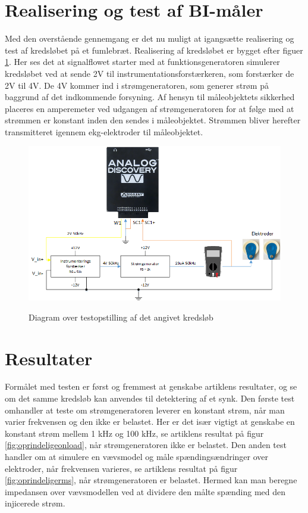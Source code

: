 \section{Realisering og test af BI-måler}

Med den overstående gennemgang er det nu muligt at igangsætte  realisering og test af kredsløbet på et fumlebræt. Realisering af kredsløbet er bygget efter figuer \ref{fig:testopstilling1}. Her ses det at signalflowet starter med at funktionsgeneratoren simulerer kredsløbet ved at sende 2V til instrumentationsforstærkeren, som forstærker de 2V til 4V. De 4V kommer ind i strømgeneratoren, som generer strøm på baggrund af det indkommende forsyning. Af hensyn til måleobjektets sikkerhed placeres en amperemeter ved udgangen af strømgeneratoren for at følge med at strømmen er konstant inden den sendes i måleobjektet. Strømmen bliver herefter transmitteret igennem ekg-elektroder til måleobjektet.      



\begin{figure}[H]
\centering
{\includegraphics[width=\linewidth]
{Figure/testopstilling11}}
\caption{Diagram over testopstilling af det angivet kredsløb}
\label{fig:testopstilling1}
\end{figure}


\section{Resultater}
Formålet med testen er først og fremmest at genskabe artiklens resultater, og se om det samme kredsløb kan anvendes til detektering af et synk. Den første test omhandler at teste om strømgeneratoren leverer en konstant strøm, når man varier frekvensen og den ikke er belastet. Her er det især vigtigt at genskabe en konstant strøm mellem 1 kHz og 100 kHz, se artiklens resultat på figur \ref{fig:oprindeligeonload}, når strømgeneratoren ikke er belastet. Den anden test handler om at simulere en vævsmodel og måle spændingsændringer over elektroder, når frekvensen varieres, se artiklens resultat på figur \ref{fig:oprindeligerms}, når strømgeneratoren er belastet. Hermed kan man beregne impedansen over vævsmodellen ved at dividere den målte spænding med den injicerede strøm.  




